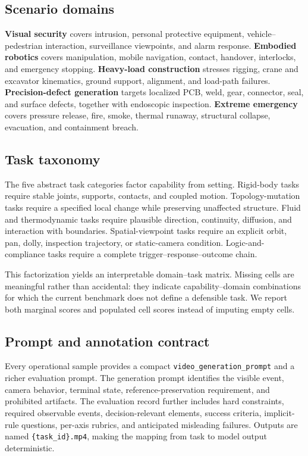 \subsection{Scenario domains}

\textbf{Visual security} covers intrusion, personal protective equipment, vehicle--pedestrian interaction, surveillance viewpoints, and alarm response. \textbf{Embodied robotics} covers manipulation, mobile navigation, contact, handover, interlocks, and emergency stopping. \textbf{Heavy-load construction} stresses rigging, crane and excavator kinematics, ground support, alignment, and load-path failures. \textbf{Precision-defect generation} targets localized PCB, weld, gear, connector, seal, and surface defects, together with endoscopic inspection. \textbf{Extreme emergency} covers pressure release, fire, smoke, thermal runaway, structural collapse, evacuation, and containment breach.

\subsection{Task taxonomy}

The five abstract task categories factor capability from setting. Rigid-body tasks require stable joints, supports, contacts, and coupled motion. Topology-mutation tasks require a specified local change while preserving unaffected structure. Fluid and thermodynamic tasks require plausible direction, continuity, diffusion, and interaction with boundaries. Spatial-viewpoint tasks require an explicit orbit, pan, dolly, inspection trajectory, or static-camera condition. Logic-and-compliance tasks require a complete trigger--response--outcome chain.

This factorization yields an interpretable domain--task matrix. Missing cells are meaningful rather than accidental: they indicate capability--domain combinations for which the current benchmark does not define a defensible task. We report both marginal scores and populated cell scores instead of imputing empty cells.

\subsection{Prompt and annotation contract}

Every operational sample provides a compact \texttt{video\_generation\_prompt} and a richer evaluation prompt. The generation prompt identifies the visible event, camera behavior, terminal state, reference-preservation requirement, and prohibited artifacts. The evaluation record further includes hard constraints, required observable events, decision-relevant elements, success criteria, implicit-rule questions, per-axis rubrics, and anticipated misleading failures. Outputs are named \texttt{\{task\_id\}.mp4}, making the mapping from task to model output deterministic.

